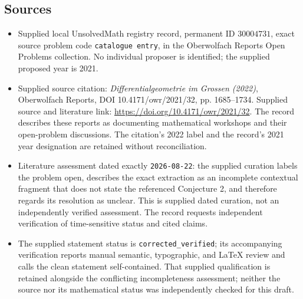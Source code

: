 \documentclass[11pt]{article}
\begin{document}
\subsection{Sources}
\begin{itemize}
\item Supplied local UnsolvedMath registry record, permanent ID \(30004731\), exact source problem code \texttt{catalogue entry}, in the Oberwolfach Reports Open Problems collection. No individual proposer is identified; the supplied proposed year is 2021.
\item Supplied source citation: \emph{Differentialgeometrie im Grossen (2022)}, Oberwolfach Reports, DOI 10.4171/owr/2021/32, pp. 1685--1734. Supplied source and literature link: \url{https://doi.org/10.4171/owr/2021/32}. The record describes these reports as documenting mathematical workshops and their open-problem discussions. The citation's 2022 label and the record's 2021 year designation are retained without reconciliation.
\item Literature assessment dated exactly \texttt{2026-08-22}: the supplied curation labels the problem open, describes the exact extraction as an incomplete contextual fragment that does not state the referenced Conjecture 2, and therefore regards its resolution as unclear. This is supplied dated curation, not an independently verified assessment. The record requests independent verification of time-sensitive status and cited claims.
\item The supplied statement status is \texttt{corrected\_verified}; its accompanying verification reports manual semantic, typographic, and LaTeX review and calls the clean statement self-contained. That supplied qualification is retained alongside the conflicting incompleteness assessment; neither the source nor its mathematical status was independently checked for this draft.
\end{itemize}
\end{document}
